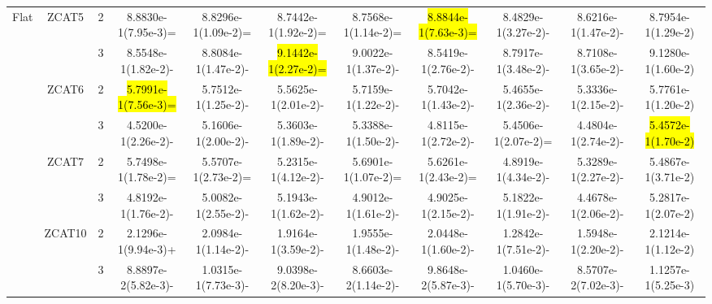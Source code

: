 \documentclass[a4paper,fleqn]{cas-dc}
\newcommand{\highlight}[1]{
	\begingroup
	\sethlcolor{Seashell}%
	\hl{#1}%
	\endgroup
}
\begin{document}
\begin{sloppypar}
\begin{table}[ht]
{\begin{tabular}{ccccccccccc}
					
					
					\multirow{8}{*}{Flat}&\multirow{2}{*}{ZCAT5}&2&8.8830e-1(7.95e-3)=	&8.8296e-1(1.09e-2)=	&8.7442e-1(1.92e-2)=	&8.7568e-1(1.14e-2)=	&\highlight{8.8844e-1(7.63e-3)=}	&8.4829e-1(3.27e-2)-	&8.6216e-1(1.47e-2)-	&8.7954e-1(1.29e-2)\\
					
					\multirow{8}{*}{~}&\multirow{2}{*}{~}&3			&8.5548e-1(1.82e-2)-		&8.8084e-1(1.47e-2)-	&\highlight{9.1442e-1(2.27e-2)=}	&9.0022e-1(1.37e-2)-	&8.5419e-1(2.76e-2)-	&8.7917e-1(3.48e-2)-	&8.7108e-1(3.65e-2)-	&9.1280e-1(1.60e-2)\\
					
					
					\multirow{8}{*}{~}&\multirow{2}{*}{ZCAT6}&2		&\highlight{5.7991e-1(7.56e-3)=}	&5.7512e-1(1.25e-2)-	&5.5625e-1(2.01e-2)-	&5.7159e-1(1.22e-2)-	&5.7042e-1(1.43e-2)-	&5.4655e-1(2.36e-2)-	&5.3336e-1(2.15e-2)-	&5.7761e-1(1.20e-2)\\
					
					\multirow{8}{*}{~}&\multirow{2}{*}{~}&3			&4.5200e-1(2.26e-2)-		&5.1606e-1(2.00e-2)-	&5.3603e-1(1.89e-2)-	&5.3388e-1(1.50e-2)-	&4.8115e-1(2.72e-2)-	&5.4506e-1(2.07e-2)=	&4.4804e-1(2.74e-2)-	&\highlight{5.4572e-1(1.70e-2)}\\
					
					
					
					\multirow{8}{*}{~}&\multirow{2}{*}{ZCAT7}&2		&5.7498e-1(1.78e-2)=	&5.5707e-1(2.73e-2)=	&5.2315e-1(4.12e-2)-	&5.6901e-1(1.07e-2)=	&5.6261e-1(2.43e-2)=	&4.8919e-1(4.34e-2)-	&5.3289e-1(2.27e-2)-	&5.4867e-1(3.71e-2)\\
					
					\multirow{8}{*}{~}&\multirow{2}{*}{~}&3		&4.8192e-1(1.76e-2)-	&5.0082e-1(2.55e-2)-	&5.1943e-1(1.62e-2)-	&4.9012e-1(1.61e-2)-	&4.9025e-1(2.15e-2)-	&5.1822e-1(1.91e-2)-	&4.4678e-1(2.06e-2)-	&5.2817e-1(2.07e-2)\\
					
					\multirow{8}{*}{~}&\multirow{2}{*}{ZCAT10}&2		&2.1296e-1(9.94e-3)+	&2.0984e-1(1.14e-2)-	&1.9164e-1(3.59e-2)-	&1.9555e-1(1.48e-2)-	&2.0448e-1(1.60e-2)-	&1.2842e-1(7.51e-2)-	&1.5948e-1(2.20e-2)-	&2.1214e-1(1.12e-2)\\
					
					\multirow{8}{*}{~}&\multirow{2}{*}{~}&3				&8.8897e-2(5.82e-3)-	&1.0315e-1(7.73e-3)-	&9.0398e-2(8.20e-3)-	&8.6603e-2(1.14e-2)-	&9.8648e-2(5.87e-3)-	&1.0460e-1(5.70e-3)-	&8.5707e-2(7.02e-3)-	&1.1257e-1(5.25e-3)\\
					\hline
					

\end{tabular}}
\end{table}
\end{sloppypar}
\end{document}
